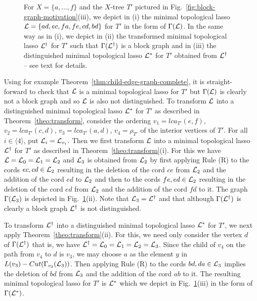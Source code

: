 \begin{figure}[h]
  \begin{center}
    
  \end{center}
  \caption{ For $X=\{a,\ldots, f\}$ and the $X$-tree $T'$ pictured in
    Fig.~\ref{fig:block-graph-motivation}(iii), we depict in (i) the minimal
    topological lasso ${\mathcal L}=\{ad,ec,fa,fe,cd,bd\}$ for $T'$ in the form of
    $\Gamma({\mathcal L})$.  In the same way as in (i), we depict in (ii) the
    transformed minimal topological lasso ${\mathcal L}^{\dagger}$ for $T'$ such that
    $\Gamma({\mathcal L}^{\dagger})$ is a block graph and in (iii) the distinguished
    minimal topological lasso ${\mathcal L}^*$ for $T'$ obtained from ${\mathcal L}^{\dagger}$
    -- see text for details.}
  \label{fig:transformation}
\end{figure}
%
Using for example Theorem~\ref{thm:child-edge-graph-complete}, it is
straight-forward to check that ${\mathcal L}$ is a minimal topological lasso for $T'$
but $\Gamma({\mathcal L})$ is clearly not a block graph and so ${\mathcal L}$ is also not
distinguished. To transform ${\mathcal L}$ into a distinguished minimal topological
lasso ${\mathcal L}^*$ for $T'$ as described in Theorem~\ref{theo:transform}, consider
the ordering $v_1=lca_{T'}(e,f)$, $v_2=lca_{T'}(c,d)$, $v_3=lca_{T'}(a,d)$,
$v_4=\rho_{T'}$ of the interior vertices of $T'$. For all $i\in\langle
4\rangle$, put ${\mathcal L}_i={\mathcal L}_{v_i}$. Then we first transform ${\mathcal L}$ into a minimal
topological lasso ${\mathcal L}^{\dagger}$ for $T'$ as described in
Theorem~\ref{theo:transform}(i). For this we have ${\mathcal L}={\mathcal L}_0={\mathcal L}_1={\mathcal L}_2$ and
${\mathcal L}_3$ is obtained from ${\mathcal L}_2$ by first applying Rule (R) to the cords $ec,
cd \in {\mathcal L}_2$ resulting in the deletion of the cord $ce$ from ${\mathcal L}_2 $ and the
addition of the cord $ed$ to ${\mathcal L}_2$ and then to the cords $fe,ed\in{\mathcal L}_2$
resulting in the deletion of the cord $ed$ from ${\mathcal L}_2$ and the addition of
the cord $fd$ to it. The graph $\Gamma({\mathcal L}_3)$ is depicted in
Fig.~\ref{fig:transformation}(ii).  Note that ${\mathcal L}_3={\mathcal L}^{\dagger}$ and that
although $\Gamma({\mathcal L}^{\dagger})$ is clearly a block graph ${\mathcal L}^{\dagger}$ is
not distinguished.

To transform ${\mathcal L}^{\dagger}$ into a distinguished minimal topological lasso
${\mathcal L}^*$ for $T'$, we next apply Theorem~\ref{theo:transform}(ii). For this, we
need only consider the vertex $d$ of $\Gamma({\mathcal L}^{\dagger})$ that is, we have
${\mathcal L}^{\dagger}={\mathcal L}_0={\mathcal L}_1={\mathcal L}_2={\mathcal L}_3$.  Since the child of $v_4$ on the path
from $v_4$ to $d$ is $v_3$, we may choose $a$ as the element $y$ in
$L(v_3)-Cut(\Gamma_{v_3}({\mathcal L}_3))$. Then applying Rule (R) to the cords
$bd,da\in {\mathcal L}_3$ implies the deletion of $bd$ from ${\mathcal L}_3$ and the addition of
the cord $ab$ to it. The resulting minimal topological lasso for $T'$ is
${\mathcal L}^*$ which we depict in Fig.~\ref{fig:transformation}(iii) in the form of
$\Gamma({\mathcal L}^*)$.
 
